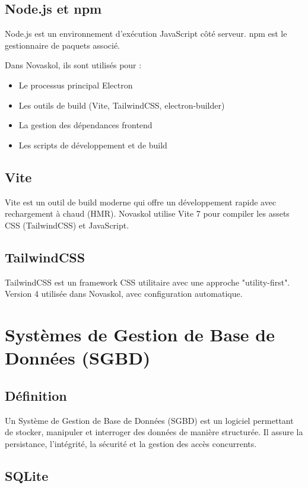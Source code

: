 \documentclass[12pt,a4paper,twoside]{report}
\begin{document}
\subsection{Node.js et npm}

Node.js est un environnement d'exécution JavaScript côté serveur. npm est le gestionnaire de paquets associé.

Dans Novaskol, ils sont utilisés pour :
\begin{itemize}
    \item Le processus principal Electron
    \item Les outils de build (Vite, TailwindCSS, electron-builder)
    \item La gestion des dépendances frontend
    \item Les scripts de développement et de build
\end{itemize}

\subsection{Vite}

Vite est un outil de build moderne qui offre un développement rapide avec rechargement à chaud (HMR). Novaskol utilise Vite 7 pour compiler les assets CSS (TailwindCSS) et JavaScript.

\subsection{TailwindCSS}

TailwindCSS est un framework CSS utilitaire avec une approche "utility-first". Version 4 utilisée dans Novaskol, avec configuration automatique.

\section{Systèmes de Gestion de Base de Données (SGBD)}

\subsection{Définition}

Un Système de Gestion de Base de Données (SGBD) est un logiciel permettant de stocker, manipuler et interroger des données de manière structurée. Il assure la persistance, l'intégrité, la sécurité et la gestion des accès concurrents.

\subsection{SQLite}
\end{document}
